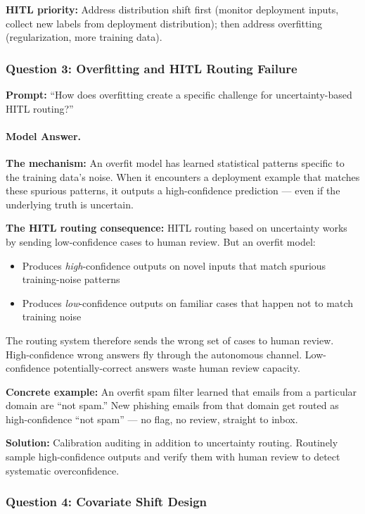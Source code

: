 \textbf{HITL priority:} Address distribution shift first (monitor deployment inputs, collect new labels from deployment distribution); then address overfitting (regularization, more training data).

\subsubsection{Question 3: Overfitting and HITL Routing Failure}

\textbf{Prompt:} ``How does overfitting create a specific challenge for uncertainty-based HITL routing?''

\paragraph{Model Answer.}

\textbf{The mechanism:} An overfit model has learned statistical patterns specific to the training data's noise. When it encounters a deployment example that matches these spurious patterns, it outputs a high-confidence prediction --- even if the underlying truth is uncertain.

\textbf{The HITL routing consequence:} HITL routing based on uncertainty works by sending low-confidence cases to human review. But an overfit model:
\begin{itemize}
    \item Produces \emph{high}-confidence outputs on novel inputs that match spurious training-noise patterns
    \item Produces \emph{low}-confidence outputs on familiar cases that happen not to match training noise
\end{itemize}

The routing system therefore sends the wrong set of cases to human review. High-confidence wrong answers fly through the autonomous channel. Low-confidence potentially-correct answers waste human review capacity.

\textbf{Concrete example:} An overfit spam filter learned that emails from a particular domain are ``not spam.'' New phishing emails from that domain get routed as high-confidence ``not spam'' --- no flag, no review, straight to inbox.

\textbf{Solution:} Calibration auditing in addition to uncertainty routing. Routinely sample high-confidence outputs and verify them with human review to detect systematic overconfidence.

\subsubsection{Question 4: Covariate Shift Design}

